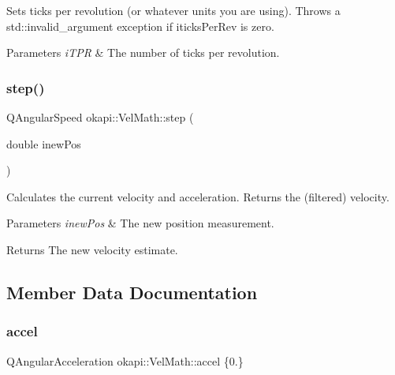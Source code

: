 Sets ticks per revolution (or whatever units you are using). Throws a {\ttfamily std\+::invalid\+\_\+argument} exception if iticks\+Per\+Rev is zero.


\begin{DoxyParams}{Parameters}
{\em i\+T\+PR} & The number of ticks per revolution. \\
\hline
\end{DoxyParams}
\mbox{\label{classokapi_1_1VelMath_a4c6e14c7f2054512b59a30736f61982f}} 
\subsubsection{\texorpdfstring{step()}{step()}}
{\footnotesize\ttfamily Q\+Angular\+Speed okapi\+::\+Vel\+Math\+::step (\begin{DoxyParamCaption}\item[{double}]{inew\+Pos }\end{DoxyParamCaption})\hspace{0.3cm}{\ttfamily [virtual]}}

Calculates the current velocity and acceleration. Returns the (filtered) velocity.


\begin{DoxyParams}{Parameters}
{\em inew\+Pos} & The new position measurement. \\
\hline
\end{DoxyParams}
\begin{DoxyReturn}{Returns}
The new velocity estimate. 
\end{DoxyReturn}


\subsection{Member Data Documentation}
\mbox{\label{classokapi_1_1VelMath_abe73288852f21916155e04266faea8b7}} 
\subsubsection{\texorpdfstring{accel}{accel}}
{\footnotesize\ttfamily Q\+Angular\+Acceleration okapi\+::\+Vel\+Math\+::accel \{0.\}\hspace{0.3cm}{\ttfamily [protected]}}

